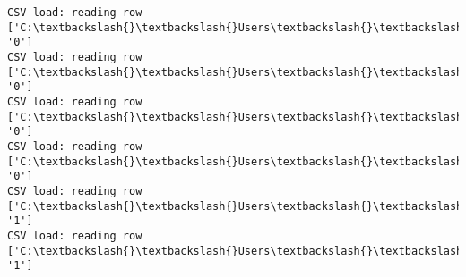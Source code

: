 \documentclass[11pt]{article}
\begin{document}
\begin{Verbatim}[commandchars=\\\{\}]
CSV load: reading row ['C:\textbackslash{}\textbackslash{}Users\textbackslash{}\textbackslash{}AbhishekGangadhar\textbackslash{}\textbackslash{}Downloads\textbackslash{}\textbackslash{}ActionRecog\textbackslash{}\textbackslash{}ActionRecog\textbackslash{}\textbackslash{}DataSets\textbackslash{}\textbackslash{}UCF11\textbackslash{}\textbackslash{}action\_youtube\_naudio\textbackslash{}\textbackslash{}biking\textbackslash{}\textbackslash{}v\_biking\_02\textbackslash{}\textbackslash{}v\_biking\_02\_04.avi', '0']
CSV load: reading row ['C:\textbackslash{}\textbackslash{}Users\textbackslash{}\textbackslash{}AbhishekGangadhar\textbackslash{}\textbackslash{}Downloads\textbackslash{}\textbackslash{}ActionRecog\textbackslash{}\textbackslash{}ActionRecog\textbackslash{}\textbackslash{}DataSets\textbackslash{}\textbackslash{}UCF11\textbackslash{}\textbackslash{}action\_youtube\_naudio\textbackslash{}\textbackslash{}biking\textbackslash{}\textbackslash{}v\_biking\_02\textbackslash{}\textbackslash{}v\_biking\_02\_05.avi', '0']
CSV load: reading row ['C:\textbackslash{}\textbackslash{}Users\textbackslash{}\textbackslash{}AbhishekGangadhar\textbackslash{}\textbackslash{}Downloads\textbackslash{}\textbackslash{}ActionRecog\textbackslash{}\textbackslash{}ActionRecog\textbackslash{}\textbackslash{}DataSets\textbackslash{}\textbackslash{}UCF11\textbackslash{}\textbackslash{}action\_youtube\_naudio\textbackslash{}\textbackslash{}biking\textbackslash{}\textbackslash{}v\_biking\_02\textbackslash{}\textbackslash{}v\_biking\_02\_06.avi', '0']
CSV load: reading row ['C:\textbackslash{}\textbackslash{}Users\textbackslash{}\textbackslash{}AbhishekGangadhar\textbackslash{}\textbackslash{}Downloads\textbackslash{}\textbackslash{}ActionRecog\textbackslash{}\textbackslash{}ActionRecog\textbackslash{}\textbackslash{}DataSets\textbackslash{}\textbackslash{}UCF11\textbackslash{}\textbackslash{}action\_youtube\_naudio\textbackslash{}\textbackslash{}biking\textbackslash{}\textbackslash{}v\_biking\_02\textbackslash{}\textbackslash{}v\_biking\_02\_07.avi', '0']
CSV load: reading row ['C:\textbackslash{}\textbackslash{}Users\textbackslash{}\textbackslash{}AbhishekGangadhar\textbackslash{}\textbackslash{}Downloads\textbackslash{}\textbackslash{}ActionRecog\textbackslash{}\textbackslash{}ActionRecog\textbackslash{}\textbackslash{}DataSets\textbackslash{}\textbackslash{}UCF11\textbackslash{}\textbackslash{}action\_youtube\_naudio\textbackslash{}\textbackslash{}golf\_swing\textbackslash{}\textbackslash{}v\_golf\_08\textbackslash{}\textbackslash{}v\_golf\_08\_01.avi', '1']
CSV load: reading row ['C:\textbackslash{}\textbackslash{}Users\textbackslash{}\textbackslash{}AbhishekGangadhar\textbackslash{}\textbackslash{}Downloads\textbackslash{}\textbackslash{}ActionRecog\textbackslash{}\textbackslash{}ActionRecog\textbackslash{}\textbackslash{}DataSets\textbackslash{}\textbackslash{}UCF11\textbackslash{}\textbackslash{}action\_youtube\_naudio\textbackslash{}\textbackslash{}golf\_swing\textbackslash{}\textbackslash{}v\_golf\_08\textbackslash{}\textbackslash{}v\_golf\_08\_02.avi', '1']

\end{Verbatim}
\end{document}
